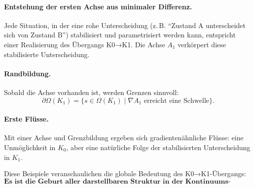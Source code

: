 \paragraph{Entstehung der ersten Achse aus minimaler Differenz.}
Jede Situation, in der eine rohe Unterscheidung (z.\,B. ``Zustand A unterscheidet
sich von Zustand B'') stabilisiert und parametrisiert werden kann, entspricht
einer Realisierung des Übergangs K0→K1. Die Achse $A_1$ verkörpert diese
stabilisierte Unterscheidung.

\paragraph{Randbildung.}
Sobald die Achse vorhanden ist, werden Grenzen sinnvoll:
\[
\partial\Omega(K_1) = \{ s \in \Omega(K_1) \mid \nabla A_1 \text{ erreicht eine Schwelle} \}.
\]

\paragraph{Erste Flüsse.}
Mit einer Achse und Grenzbildung ergeben sich gradientenähnliche Flüsse:
eine Unmöglichkeit in $K_0$, aber eine natürliche Folge der stabilisierten
Unterscheidung in $K_1$.

Diese Beispiele veranschaulichen die globale Bedeutung des K0→K1-Übergangs:
\[
\textbf{Es ist die Geburt aller darstellbaren Struktur in der
Kontinuums-Hierarchie.}
\]
